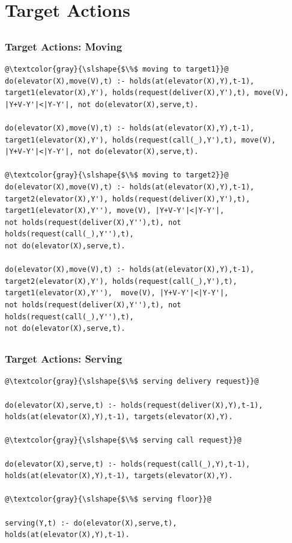 \documentclass{beamer}
\begin{document}
\section{Target Actions}
\subsection{}
\begin{frame}[fragile]
\frametitle{Target Actions: Moving}
\begin{adjustwidth}{-1em}{-1em}
\begin{lstlisting}[basicstyle=\scriptsize\ttfamily]
@\textcolor{gray}{\slshape{$\%$ moving to target1}}@
do(elevator(X),move(V),t) :- holds(at(elevator(X),Y),t-1),
target1(elevator(X),Y'), holds(request(deliver(X),Y'),t), move(V),
|Y+V-Y'|<|Y-Y'|, not do(elevator(X),serve,t).

do(elevator(X),move(V),t) :- holds(at(elevator(X),Y),t-1), 
target1(elevator(X),Y'), holds(request(call(_),Y'),t), move(V),
|Y+V-Y'|<|Y-Y'|, not do(elevator(X),serve,t).

@\textcolor{gray}{\slshape{$\%$ moving to target2}}@
do(elevator(X),move(V),t) :- holds(at(elevator(X),Y),t-1), 
target2(elevator(X),Y'), holds(request(deliver(X),Y'),t), 
target1(elevator(X),Y''), move(V), |Y+V-Y'|<|Y-Y'|, 
not holds(request(deliver(X),Y''),t), not holds(request(call(_),Y''),t),
not do(elevator(X),serve,t).

do(elevator(X),move(V),t) :- holds(at(elevator(X),Y),t-1), 
target2(elevator(X),Y'), holds(request(call(_),Y'),t), 
target1(elevator(X),Y''),  move(V), |Y+V-Y'|<|Y-Y'|, 
not holds(request(deliver(X),Y''),t), not holds(request(call(_),Y''),t), 
not do(elevator(X),serve,t).
\end{lstlisting}
\end{adjustwidth}
\end{frame}

\subsection{}
\begin{frame}[fragile]
\frametitle{Target Actions: Serving}
\begin{adjustwidth}{-1em}{-1em}
\begin{lstlisting}
@\textcolor{gray}{\slshape{$\%$ serving delivery request}}@

do(elevator(X),serve,t) :- holds(request(deliver(X),Y),t-1), 
holds(at(elevator(X),Y),t-1), targets(elevator(X),Y).

@\textcolor{gray}{\slshape{$\%$ serving call request}}@

do(elevator(X),serve,t) :- holds(request(call(_),Y),t-1), 
holds(at(elevator(X),Y),t-1), targets(elevator(X),Y).

@\textcolor{gray}{\slshape{$\%$ serving floor}}@

serving(Y,t) :- do(elevator(X),serve,t), 
holds(at(elevator(X),Y),t-1).
\end{lstlisting}
\end{adjustwidth}
\end{frame}
\end{document}
